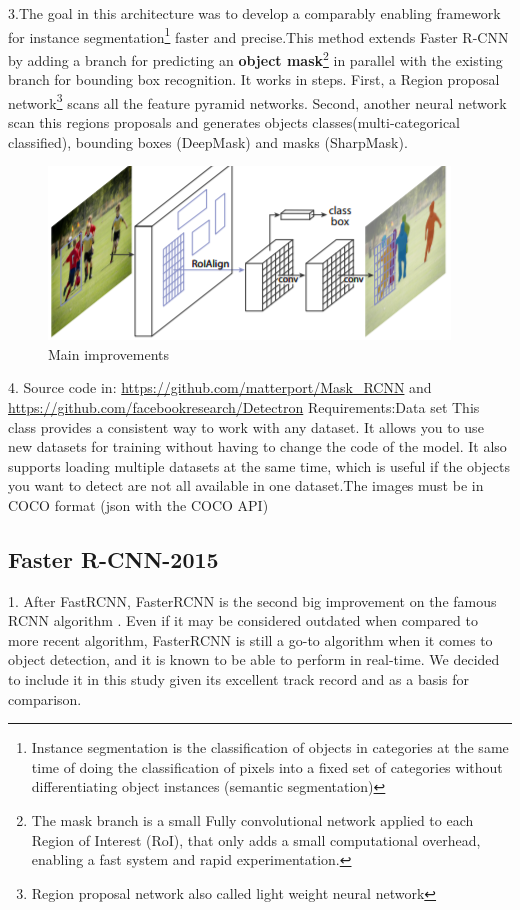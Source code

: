\documentclass[10pt]{article}
\begin{document}
3.The goal in this architecture was to develop a
comparably enabling framework for instance segmentation\footnote{Instance segmentation is the classification of objects in categories at the same time of doing the classification of pixels into a fixed set of categories without differentiating object instances (semantic segmentation)} faster and precise.This method extends Faster R-CNN by adding a branch for predicting an \textbf{object mask}\footnote{The mask branch is a small Fully convolutional network applied to each Region of Interest (RoI), that only adds a small computational overhead, enabling a fast system and rapid experimentation.} in parallel with the existing branch for bounding box recognition. 
It works in steps. First, a Region proposal network\footnote{Region proposal network also called light weight neural network} scans all the feature pyramid networks. Second, another neural network scan this regions proposals and generates objects classes(multi-categorical classified), bounding boxes (DeepMask) and masks (SharpMask).\\
\begin{figure}[H]
  	\centering
    \includegraphics[scale=0.8]{MaskRCNN.PNG}
    \caption{ Main improvements \cite{redmon2017yolo9000}}
\end{figure}



4. Source code in: \url{https://github.com/matterport/Mask_RCNN}
and
\url{https://github.com/facebookresearch/Detectron}
\cite{matterport_maskrcnn_2017}
Requirements:Data set This class provides a consistent way to work with any dataset. It allows you to use new datasets for training without having to change the code of the model. It also supports loading multiple datasets at the same time, which is useful if the objects you want to detect are not all available in one dataset.The images must be in COCO format (json with the COCO API)


\subsection{Faster R-CNN-2015}
1. After FastRCNN, FasterRCNN is the second big improvement on the famous RCNN algorithm \cite{ren2015faster}. Even if it may be considered outdated when compared to more recent algorithm, FasterRCNN is still a go-to algorithm when it comes to object detection, and it is known to be able to perform in real-time. We decided to include it in this study given its excellent track record and as a basis for comparison.\\
\end{document}
